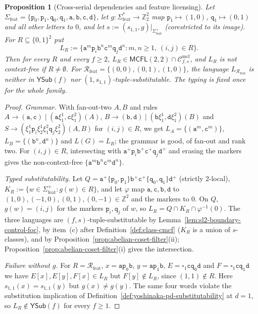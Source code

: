 \documentclass[11pt]{article}
\numberwithin{equation}{section}
\theoremstyle{plain}
\newtheorem{proposition}[theorem]{Proposition}
\theoremstyle{definition}
\theoremstyle{remark}
\newcommand{\Cmcf}[2]{\mathcal{C}^{\mathrm{mcf}}_{#1,#2}}
\newcommand{\blank}{\square}
\newcommand{\YSub}[1]{\mathsf{YSub}(#1)}
\theoremstyle{plain}
\begin{document}
\begin{proposition}[Cross-serial dependencies and feature licensing]
\label{prop:feature-cross-typed}
Let $\Sigma_{\mathrm{feat}}=\{\mathtt p_0,\mathtt p_1,\allowbreak\mathtt q_0,\mathtt q_1,\allowbreak
\mathtt a,\mathtt b,\mathtt c,\mathtt d\}$, let $g:\Sigma_{\mathrm{feat}}^*\to\mathbb Z_2^2$
map $\mathtt p_1\mapsto(1,0)$, $\mathtt q_1\mapsto(0,1)$ and all other letters to $0$, and
let $s:=(s_{1,1},g)|_{\Sigma_{\mathrm{feat}}^+}$ (corestricted to its image).  For
$R\subseteq\{0,1\}^2$ put
\[
 L_R:=\{\mathtt a^m\mathtt p_i\mathtt b^n\mathtt c^m\mathtt q_j\mathtt d^n:
 m,n\ge1,\ (i,j)\in R\}.
\]
Then for every $R$ and every $f\ge2$, $L_R\in\mathsf{MCFL}(2,2)\cap\Cmcf{f}{s}$, and
$L_R$ is not context-free if $R\ne\emptyset$.  For
$\mathcal R_{\mathrm{feat}}=\{(0,0),(0,1),(1,0)\}$, the language
$L_{\mathcal R_{\mathrm{feat}}}$ is neither in $\YSub{f}$ nor
$(1,s_{1,1})$-tuple-substitutable.  The typing is fixed once for the whole
family.
\end{proposition}

\begin{proof}
\emph{Grammar.}  With fan-out-two $A,B$ and rules
$A\to(\mathtt a,\mathtt c)\mid(\mathtt a\xi_1^1,\mathtt c\xi_1^2)(A)$,
$B\to(\mathtt b,\mathtt d)\mid(\mathtt b\xi_1^1,\mathtt d\xi_1^2)(B)$ and
$S\to(\xi_1^1\mathtt p_i\xi_2^1\xi_1^2\mathtt q_j\xi_2^2)(A,B)$ for
$(i,j)\in R$, we get $L_A=\{(\mathtt a^m,\mathtt c^m)\}$,
$L_B=\{(\mathtt b^n,\mathtt d^n)\}$ and $L(G)=L_R$; the grammar is good,
of fan-out and rank two.  For $(i,j)\in R$, intersecting with
$\mathtt a^+\mathtt p_i\mathtt b^+\mathtt c^+\mathtt q_j\mathtt d^+$ and erasing the
markers gives the non-context-free $\{\mathtt a^m\mathtt b^n\mathtt c^m\mathtt d^n\}$.

\emph{Typed substitutability.}  Let
$Q=\mathtt a^+\{\mathtt p_0,\mathtt p_1\}\mathtt b^+\mathtt c^+\{\mathtt q_0,\mathtt q_1\}
\mathtt d^+$ (strictly 2-local), $K_R:=\{w\in\Sigma_{\mathrm{feat}}^+:g(w)\in R\}$, and let
$\varphi$ map $\mathtt a,\mathtt c,\mathtt b,\mathtt d$ to
$(1,0),(-1,0),(0,1),(0,-1)\in\mathbb Z^2$ and the markers to $0$.  On $Q$,
$g(w)=(i,j)$ for the markers $\mathtt p_i,\mathtt q_j$ of $w$, so
$L_R=Q\cap K_R\cap\varphi^{-1}(0)$.  The three languages are
$(f,s)$-tuple-substitutable by Lemma~\ref{lem:sl2-boundary-control-foc}, by item~(c)
after Definition~\ref{def:class-cmcf} ($K_R$ is a union of $s$-classes), and by
Proposition~\ref{prop:abelian-coset-filter}(ii);
Proposition~\ref{prop:abelian-coset-filter}(i) gives the intersection.

\emph{Failure without $g$.}  For $R=\mathcal R_{\mathrm{feat}}$, $x=\mathtt{ap_0b}$,
$y=\mathtt{ap_1b}$, $E=\blank_1\mathtt{cq_0d}$ and $F=\blank_1\mathtt{cq_1d}$ we have
$E[x],E[y],F[x]\in L_R$ but $F[y]\notin L_R$, since $(1,1)\notin R$.  Here
$s_{1,1}(x)=s_{1,1}(y)$ but $g(x)\ne g(y)$.  The same four words violate the
substitution implication of Definition~\ref{def:yoshinaka-pd-substitutability} at
$d=1$, so $L_R\notin\YSub{f}$ for every $f\ge1$.
\end{proof}
\end{document}
